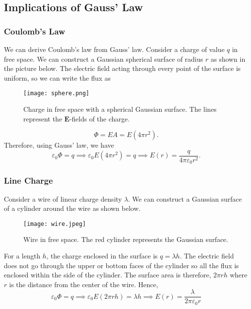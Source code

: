 \documentclass[12pt]{article}
\let\vec\mathbf
\begin{document}
  \subsection{Implications of Gauss' Law}
  \subsubsection{Coulomb's Law}
  We can derive Coulomb's law from Gauss' law. Consider a charge of value $q$ in free space. We can construct a Gaussian spherical surface of radius $r$ as shown in the picture below. The electric field acting through every point of the surface is uniform, so we can write the flux as 
  \begin{figure}[H]
  \centering
      \texttt{[image: sphere.png]}
      \caption{Charge in free space with a spherical Gaussian surface. The lines represent the $\vec E$-fields of the charge.}
  \end{figure}
  \[\Phi = EA = E(4\pi r^2).\]
  Therefore, using Gauss' law, we have 
  \[\varepsilon_0 \Phi = q \implies \varepsilon_0 E (4\pi r^2) = q\implies E(r) = \frac{q}{4\pi \varepsilon_0 r^2}.\]
  \subsubsection{Line Charge}
  Consider a wire of linear charge density $\lambda$. We can construct a Gaussian surface of a cylinder around the wire as shown below. 
  \begin{figure}[H]
  \centering
      \texttt{[image: wire.jpeg]}
      \caption{Wire in free space. The red cylinder represents the Gaussian surface.}
  \end{figure}
  For a length $h$, the charge enclosed in the surface is $q = \lambda h$. The electric field does not go through the upper or bottom faces of the cylinder so all the flux is enclosed within the side of the cylinder. The surface area is therefore, $2\pi rh$ where $r$ is the distance from the center of the wire. Hence, 
  \[\varepsilon_0 \Phi = q\implies \varepsilon_0 E(2\pi rh) = \lambda h\implies E(r) = \frac{\lambda}{2\pi \varepsilon_0 r}\]
\end{document}
